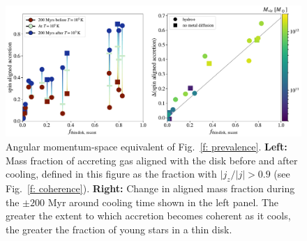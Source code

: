 \documentclass[fleqn,usenatbib]{mnras}
\begin{document}
\begin{figure}
    \centering
    \includegraphics[width=\textwidth]{figures/prevalence/aligned_fraction_ang_momentum.pdf}
    \caption{
    Angular momentum-space equivalent of Fig.~\ref{f: prevalence}.
    \textbf{Left:}
    Mass fraction of accreting gas aligned with the disk before and after cooling, defined in this figure as the fraction with $\vert j_z/\vert j \vert > 0.9$ (see Fig.~\ref{f: coherence}).
    \textbf{Right:}
    Change in aligned mass fraction during the $\pm200$ Myr around cooling time shown in the left panel.
    The greater the extent to which accretion becomes coherent as it cools, the greater the fraction of young stars in a thin disk.
    }
    \label{f: prevalence - angular momentum}
\end{figure}
\end{document}
